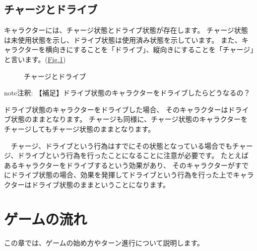 \documentclass[letterpaper,10pt,dvipdfmx]{sphinxmanual}
\begin{document}
\subsection{チャージとドライブ}
\label{\detokenize{common/01-base:id10}}
キャラクターには、チャージ状態とドライブ状態が存在します。
チャージ状態は未使用状態を示し、ドライブ状態は使用済み状態を示しています。
また、キャラクターを横向きにすることを「ドライブ」、縦向きにすることを「チャージ」と言います。(\hyperref[\detokenize{common/01-base:chargedrive}]{Fig.\@ \ref{\detokenize{common/01-base:chargedrive}}})

\begin{figure}[htbp]
\centering
\capstart

\noindent{}
\caption{チャージとドライブ}\label{\detokenize{common/01-base:id13}}\label{\detokenize{common/01-base:chargedrive}}\end{figure}

\begin{sphinxadmonition}{note}{注釈:}
【補足】ドライブ状態のキャラクターをドライブしたらどうなるの？

ドライブ状態のキャラクターをドライブした場合、
そのキャラクターはドライブ状態のままとなります。
チャージも同様に、チャージ状態のキャラクターをチャージしてもチャージ状態のままとなります。

　チャージ、ドライブという行為はすでにその状態となっている場合でもチャージ、ドライブという行為を行ったことになることに注意が必要です。
たとえばあるキャラクターをドライブするという効果があり、
そのキャラクターがすでにドライブ状態の場合、効果を発揮してドライブという行為を行った上でキャラクターはドライブ状態のままということになります。
\end{sphinxadmonition}


\section{ゲームの流れ}
\label{\detokenize{common/02-turn:id1}}\label{\detokenize{common/02-turn::doc}}
この章では、ゲームの始め方やターン進行について説明します。
\end{document}
